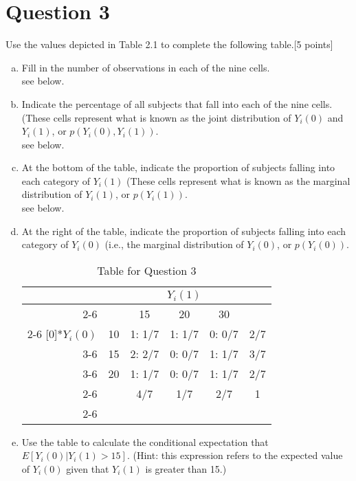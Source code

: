\documentclass[11pt,notitlepage]{article}		%
\begin{document}
\section*{Question 3}
Use the values depicted in Table 2.1 to complete the following table.[5 points]
\begin{enumerate}[a)]
\item Fill in the number of observations in each of the nine cells. \\
see below.
\item Indicate the percentage of all subjects that fall into each of the nine cells. (These cells represent what is known as the joint distribution of $Y_{i}(0)$ and $Y_{i}(1)$, or $p(Y_{i}(0), Y_{i}(1))$.\\
see below.
\item At the bottom of the table, indicate the proportion of subjects falling into each category of $Y_{i}(1)$ (These cells represent what is known as the marginal distribution of $Y_{i}(1)$, or $p(Y_{i}(1))$. \\
see below.
\item At the right of the table, indicate the proportion of subjects falling into each category of $Y_{i}(0)$ (i.e., the marginal distribution of $Y_{i}(0)$, or $p(Y_{i}(0))$. \\

\begin{table}[H]
  \centering
  \caption{Table for Question 3}
    \begin{tabular}{r|r|c|c|c|c|}
     \multicolumn{1}{c}{}       &      \multicolumn{1}{c}{}    & \multicolumn{3}{c}{$Y_{i}(1)$}  &    \multicolumn{1}{c}{} \\ \cline{2-6}
     &        &  \multicolumn{1}{c}{15}    &  \multicolumn{1}{c}{20}    &    30    &   \\ \cline{2-6}
   \multirow{3}[0]{*}{$Y_{i}(0)$} & 10    & 1: 1/7   & 1: 1/7   & 0: 0/7     & 2/7 \\\cline{3-6}
     & 15    & 2: 2/7   & 0: 0/7     & 1: 1/7   & 3/7 \\ \cline{3-6}
     & 20    & 1: 1/7   & 0: 0/7     & 1: 1/7   & 2/7 \\ \cline{2-6}
          &       & 4/7   & 1/7   & 2/7   & 1 \\
\cline{2-6}
    \end{tabular}
\end{table}

\item Use the table to calculate the conditional expectation that $E[Y_{i}(0)|Y_{i}(1) > 15]$.  (Hint: this expression refers to the expected value of $Y_i (0)$ given that $Y_i (1)$ is greater than 15.) 


\end{enumerate}
\end{document}

